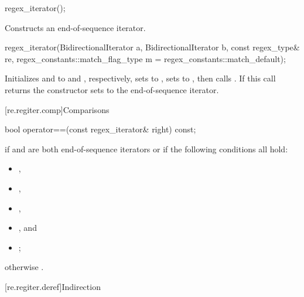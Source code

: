 %
\begin{itemdecl}
regex_iterator();
\end{itemdecl}

\begin{itemdescr}
\pnum
\effects
Constructs an end-of-sequence iterator.
\end{itemdescr}

\begin{indexed}{}
\begin{itemdecl}
regex_iterator(BidirectionalIterator a, BidirectionalIterator b,
               const regex_type& re,
               regex_constants::match_flag_type m = regex_constants::match_default);
\end{itemdecl}
\end{indexed}

\begin{itemdescr}
\pnum
\effects
Initializes  and  to
 and , respectively, sets
 to , sets  to
, then calls . If this
call returns  the constructor sets  to the end-of-sequence
iterator.
\end{itemdescr}

[re.regiter.comp]{Comparisons}

%
\begin{itemdecl}
bool operator==(const regex_iterator& right) const;
\end{itemdecl}

\begin{itemdescr}
\pnum
\returns
{} if  and  are both end-of-sequence
iterators or if the following conditions all hold:
\begin{itemize}
\item {},
\item {},
\item {},
\item {}, and
\item {};
\end{itemize}
otherwise .
\end{itemdescr}

[re.regiter.deref]{Indirection}

